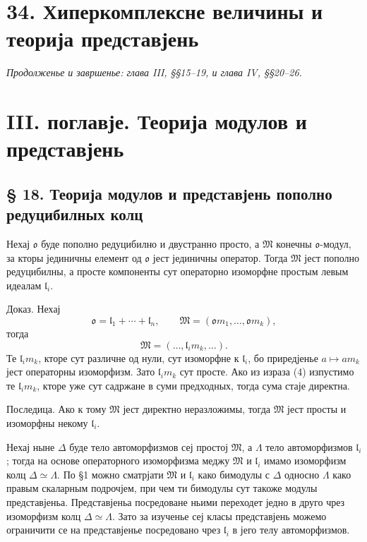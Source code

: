﻿\documentclass[11pt]{article}
\providecommand{\mo}{\mathfrak{o}}
\providecommand{\ml}{\mathfrak{l}}
\providecommand{\mM}{\mathfrak{M}}
\begin{document}
\section*{34. Хиперкомплексне величины и теорија представјень}
\emph{Продолженье и завршенье: глава III, §§15--19, и глава IV, §§20--26.}

\section*{III. поглавје. Теорија модулов и представјень}

\subsection*{§ 18. Теорија модулов и представјень пополно редуцибилных колц}

Нехај $\mo$ буде пополно редуцибилно и двустранно просто, а $\mM$ конечны $\mo$-модул, за кторы јединичны елемент од $\mo$ јест јединичны оператор. Тогда $\mM$ јест пополно редуцибилны, а просте компоненты сут операторно изоморфне простым левым идеалам $\ml_i$.

Доказ. Нехај
\[
        \mo=\ml_1+\cdots+\ml_n,
        \qquad
        \mM=(\mo m_1,\ldots,\mo m_k),
\]
тогда
\[
        \mM=(\ldots,\ml_i m_k,\ldots).                     \tag{4}
\]
Те $\ml_i m_k$, кторе сут различне од нули, сут изоморфне к $\ml_i$, бо приредјенье $a\mapsto am_k$ јест операторны изоморфизм. Зато $\ml_i m_k$ сут просте. Ако из израза (4) изпустимо те $\ml_i m_k$, кторе уже сут садржане в суми предходных, тогда сума стаје директна.

Последица. Ако к тому $\mM$ јест директно неразложимы, тогда $\mM$ јест просты и изоморфны некому $\ml_i$.

Нехај ныне $\Delta$ буде тело автоморфизмов сеј простој $\mM$, а $\Lambda$ тело автоморфизмов $\ml_i$; тогда на основе операторного изоморфизма меджу $\mM$ и $\ml_i$ имамо изоморфизм колц $\Delta\simeq\Lambda$. По §1 можно сматрјати $\mM$ и $\ml_i$ како бимодулы с $\Delta$ односно $\Lambda$ како правым скаларным подрочјем, при чем ти бимодулы сут такоже модулы представјеньа. Представјеньа посредоване ньими переходет једно в друго чрез изоморфизм колц $\Delta\simeq\Lambda$. Зато за изученье сеј класы представјень можемо ограничити се на представјенье посредовано чрез $\ml_i$ в јего телу автоморфизмов.
\end{document}
